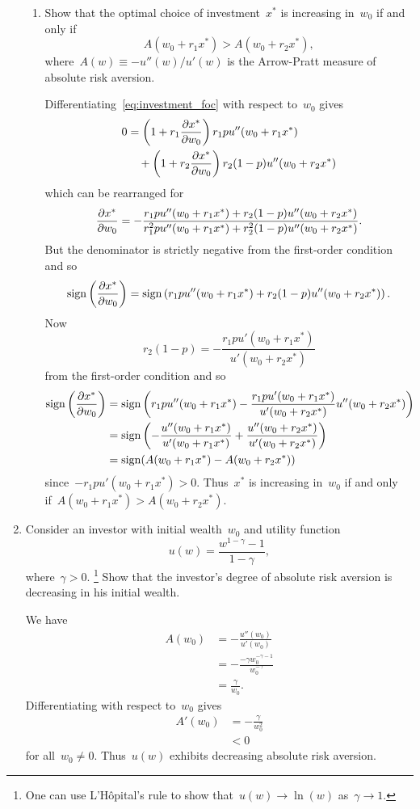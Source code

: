 \begin{enumerate}
\begin{enumerate}
		\item
		Show that the optimal choice of investment~$x^*$ is increasing in~$w_0$ if and only if
		\[ A(w_0+r_1x^*)>A(w_0+r_2x^*), \]
		where~$A(w)\equiv-u''(w)/u'(w)$ is the Arrow-Pratt measure of absolute risk aversion.
		\begin{solution}
			Differentiating~\eqref{eq:investment_foc} with respect to~$w_0$ gives
			\begin{align}
				0
				&= \left(1+r_1\frac{\partial x^*}{\partial w_0}\right)r_1pu''(w_0+r_1x^*)\\
					&\quad+\left(1+r_2\frac{\partial x^*}{\partial w_0}\right)r_2(1-p)u''(w_0+r_2x^*)
			\end{align}
			which can be rearranged for
			\[ \frac{\partial x^*}{\partial w_0}=-\frac{r_1pu''(w_0+r_1x^*)+r_2(1-p)u''(w_0+r_2x^*)}{r_1^2pu''(w_0+r_1x^*)+r_2^2(1-p)u''(w_0+r_2x^*)}. \]
			But the denominator is strictly negative from the first-order condition and so
			\[ \operatorname{sign}\left(\frac{\partial x^*}{\partial w_0}\right)=\operatorname{sign}\left(r_1pu''(w_0+r_1x^*)+r_2(1-p)u''(w_0+r_2x^*)\right). \]
			Now
			\[ r_2(1-p)=-\frac{r_1pu'(w_0+r_1x^*)}{u'(w_0+r_2x^*)} \]
			from the first-order condition and so
			\begin{align}
				\operatorname{sign}\left(\frac{\partial x^*}{\partial w_0}\right)
				&= \operatorname{sign}\left(r_1pu''(w_0+r_1x^*)-\frac{r_1pu'(w_0+r_1x^*)}{u'(w_0+r_2x^*)}u''(w_0+r_2x^*)\right)\\
				&= \operatorname{sign}\left(-\frac{u''(w_0+r_1x^*)}{u'(w_0+r_1x^*)}+\frac{u''(w_0+r_2x^*)}{u'(w_0+r_2x^*)}\right)\\
				&= \operatorname{sign}(A(w_0+r_1x^*)-A(w_0+r_2x^*))
			\end{align}
			since~$-r_1pu'(w_0+r_1x^*)>0$.
			Thus~$x^*$ is increasing in~$w_0$ if and only if~$A(w_0+r_1x^*)>A(w_0+r_2x^*)$.
		\end{solution}

	\end{enumerate}

	\item
	Consider an investor with initial wealth~$w_0$ and utility function
	\[ u(w)=\frac{w^{1-\gamma}-1}{1-\gamma}, \]
	where~$\gamma>0$.%
	\footnote{One can use L'H\^{o}pital's rule to show that~$u(w)\to\ln(w)$ as~$\gamma\to1$.}
	Show that the investor's degree of absolute risk aversion is decreasing in his initial wealth.
	\begin{solution}
		We have
		\begin{align}
			A(w_0)
			&= -\frac{u''(w_0)}{u'(w_0)}\\
			&= -\frac{-\gamma w_0^{-\gamma-1}}{w_0^{-\gamma}}\\
			&= \frac{\gamma}{w_0}.
		\end{align}
		Differentiating with respect to~$w_0$ gives
		\begin{align}
			A'(w_0)
			&= -\frac{\gamma}{w_0^2}\\
			&< 0
		\end{align}
		for all~$w_0\not=0$.
		Thus~$u(w)$ exhibits decreasing absolute risk aversion.
	\end{solution}


\end{enumerate}
